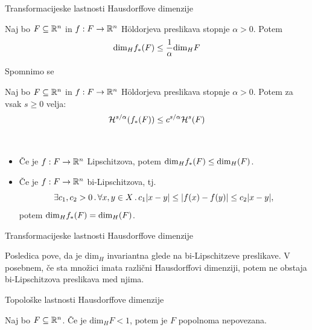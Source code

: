 \documentclass[10pt]{beamer}
\begin{document}
\begin{frame}[t]{Transformacijeske lastnosti Hausdorffove dimenzije}
    \begin{trditev}
        Naj bo \(F \subseteq \mathbb{R}^n\) in \(f: F \to \mathbb{R}^n\) Höldorjeva preslikava stopnje \(\alpha > 0\). Potem 
        \[\text{dim}_H f_{*}(F) \leq \frac{1}{\alpha} \text{dim}_H F\]        
    \end{trditev}
    \pause
     {
        Spomnimo se
        \begin{trditev}
            Naj bo \(F \subseteq \mathbb{R}^n\) in \(f: F \to \mathbb{R}^n\) Höldorjeva preslikava stopnje \(\alpha > 0\). Potem za vsak \(s \geq 0\) velja:
            \[\mathcal{H}^{s/\alpha}(f_{*}(F)) \leq c^{s/\alpha} \mathcal{H}^s(F)\]
        \end{trditev}
    }
    \pause
    \begin{posledica}
        \ 
        \begin{itemize}
            \item Če je \(f: F \to \mathbb{R}^n\) Lipschitzova, potem \(\text{dim}_H f_{*}(F) \leq \text{dim}_H(F)\).
            \pause
            \item Če je \(f: F \to \mathbb{R}^n\) bi-Lipschitzova, tj.
            \[\exists c_1, c_2 > 0 \,.\, \forall x, y \in X \,.\, c_1 |x- y| \leq |f(x) - f(y)| \leq c_2 |x - y|,\] 
            potem \(\text{dim}_H f_{*}(F) = \text{dim}_H(F)\).
        \end{itemize}
    \end{posledica}
\end{frame}

\begin{frame}[t]{Transformacijeske lastnosti Hausdorffove dimenzije}
    \begin{opomba}
        Posledica pove, da je \(\text{dim}_H\) invariantna glede na bi-Lipschitzeve preslikave. V posebnem, če sta množici imata različni Hausdorffovi dimenziji, potem ne obstaja bi-Lipschitzova preslikava med njima.
    \end{opomba}
\end{frame}

\begin{frame}[t]{Topološke lastnosti Hausdorffove dimenzije}
    \begin{trditev}
        Naj bo \(F \subseteq \mathbb{R}^n\). Če je \(\text{dim}_H F < 1\), potem je \(F\) \only<1>{...}\pause popolnoma nepovezana.
    \end{trditev}
\end{frame}
\end{document}
